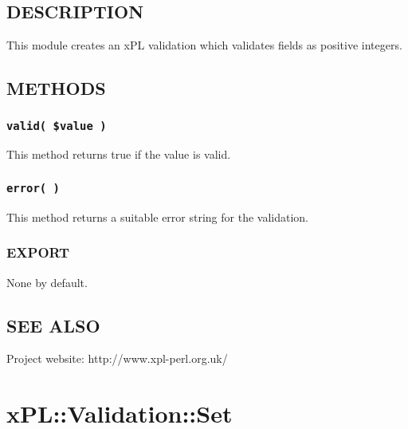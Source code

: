 \documentclass[12pt,a4paper]{article}
\begin{document}
\subsection*{DESCRIPTION\label{xPL::Validation::PositiveInteger_DESCRIPTION}}


This module creates an xPL validation which validates fields
as positive integers.

\subsection*{METHODS\label{xPL::Validation::PositiveInteger_METHODS}}
\subsubsection*{\texttt{valid( \$value )}\label{xPL::Validation::PositiveInteger_valid_value_}}


This method returns true if the value is valid.

\subsubsection*{\texttt{error( )}\label{xPL::Validation::PositiveInteger_error_}}


This method returns a suitable error string for the validation.

\subsubsection*{EXPORT\label{xPL::Validation::PositiveInteger_EXPORT}}


None by default.

\subsection*{SEE ALSO\label{xPL::Validation::PositiveInteger_SEE_ALSO}}


Project website: http://www.xpl-perl.org.uk/

\newpage
\section{xPL::Validation::Set\label{xPL::Validation::Set}}
\end{document}
